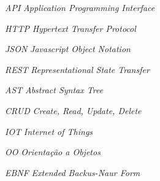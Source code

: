 


\begin{siglas}
    \item[\textit{API}] \textit{Application Programming Interface}
    \item[\textit{HTTP}] \textit{Hypertext Transfer Protocol}
    \item[\textit{JSON}] \textit{Javascript Object Notation}
    \item[\textit{REST}] \textit{Representational State Transfer}
    \item[\textit{AST}] \textit{Abstract Syntax Tree}
    \item[\textit{CRUD}] \textit{Create, Read, Update, Delete}
    \item[\textit{IOT}] \textit{Internet of Things}
    \item[\textit{OO}] \textit{Orientação a Objetos}
    \item[\textit{EBNF}] \textit{Extended Backus-Naur Form}
\end{siglas}

